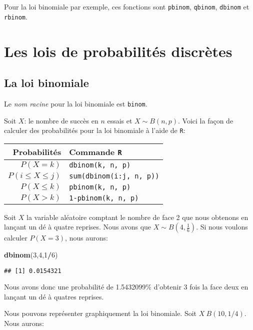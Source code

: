 \documentclass[]{book}
\newenvironment{Shaded}{\begin{snugshade}}{\end{snugshade}}
\newcommand{\KeywordTok}[1]{\textcolor[rgb]{0.13,0.29,0.53}{\textbf{#1}}}
\newcommand{\DecValTok}[1]{\textcolor[rgb]{0.00,0.00,0.81}{#1}}
\newcommand{\OperatorTok}[1]{\textcolor[rgb]{0.81,0.36,0.00}{\textbf{#1}}}
\newcommand{\NormalTok}[1]{#1}
\begin{document}
Pour la loi binomiale par exemple, ces fonctions sont \texttt{pbinom},
\texttt{qbinom}, \texttt{dbinom} et \texttt{rbinom}.

\section{Les lois de probabilités
discrètes}\label{les-lois-de-probabilites-discretes}

\subsection{La loi binomiale}\label{la-loi-binomiale}

Le \emph{nom racine} pour la loi binomiale est \texttt{binom}.

Soit \(X\): le nombre de succès en \(n\) essais et \(X\sim B(n,p)\).
Voici la façon de calculer des probabilités pour la loi binomiale à
l'aide de \texttt{R}:

\begin{longtable}[]{@{}rl@{}}
\toprule
Probabilités & Commande \texttt{R}\tabularnewline
\midrule
\endhead
\(P(X=k)\) & \texttt{dbinom(k,\ n,\ p)}\tabularnewline
\(P(i\leq X \leq j)\) & \texttt{sum(dbinom(i:j,\ n,\ p))}\tabularnewline
\(P(X\leq k)\) & \texttt{pbinom(k,\ n,\ p)}\tabularnewline
\(P(X>k)\) & \texttt{1-pbinom(k,\ n,\ p)}\tabularnewline
\bottomrule
\end{longtable}

Soit \(X\) la variable aléatoire comptant le nombre de face 2 que nous
obtenons en lançant un dé à quatre reprises. Nous avons que
\(X\sim B(4,\frac{1}{6})\). Si nous voulons calculer \(P(X=3)\), nous
aurons:

\begin{Shaded}
\begin{Highlighting}[]
\KeywordTok{dbinom}\NormalTok{(}\DecValTok{3}\NormalTok{,}\DecValTok{4}\NormalTok{,}\DecValTok{1}\OperatorTok{/}\DecValTok{6}\NormalTok{)}
\end{Highlighting}
\end{Shaded}

\begin{verbatim}
## [1] 0.0154321
\end{verbatim}

Nous avons donc une probabilité de 1.5432099\% d'obtenir 3 fois la face
deux en lançant un dé à quatres reprises.

Nous pouvons représenter graphiquement la loi binomiale. Soit
\(X~B(10,1/4)\). Nous aurons:
\end{document}
